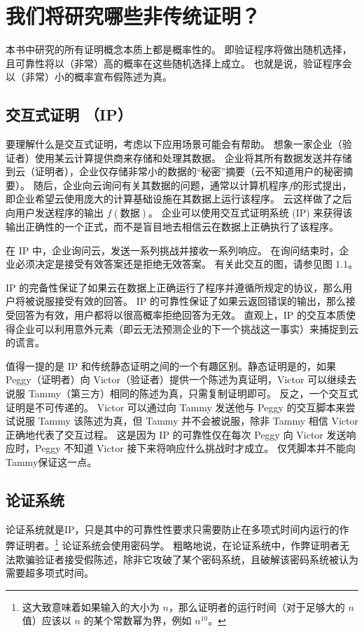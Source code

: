 \section{我们将研究哪些非传统证明？}
本书中研究的所有证明概念本质上都是概率性的。
即验证程序将做出随机选择，且可靠性将以（非常）高的概率在这些随机选择上成立。 
也就是说，验证程序会以（非常）小的概率宣布假陈述为真。

\subsection{交互式证明 （IP）}
要理解什么是交互式证明，考虑以下应用场景可能会有帮助。 想象一家企业（验证者）使用某云计算提供商来存储和处理其数据。 
企业将其所有数据发送并存储到云（证明者），企业仅存储非常小的数据的“秘密”摘要（云不知道用户的秘密摘要）。 
随后，企业向云询问有关其数据的问题，通常以计算机程序$f$的形式提出，即企业希望云使用庞大的计算基础设施在其数据上运行该程序。 
云这样做了之后向用户发送程序的输出 $f(\text{数据})$。 企业可以使用交互式证明系统 (IP) 来获得该输出正确性的一个正式，而不是盲目地去相信云在数据上正确执行了该程序。

在 IP 中，企业询问云，发送一系列挑战并接收一系列响应。 在询问结束时，企业必须决定是接受有效答案还是拒绝无效答案。 有关此交互的图，请参见图 1.1。

IP 的完备性保证了如果云在数据上正确运行了程序并遵循所规定的协议，那么用户将被说服接受有效的回答。 IP 的可靠性保证了如果云返回错误的输出，那么接受回答为有效，用户都将以很高概率拒绝回答为无效。 直观上，IP 的交互本质使得企业可以利用意外元素（即云无法预测企业的下一个挑战这一事实）来捕捉到云的谎言。

值得一提的是 IP 和传统静态证明之间的一个有趣区别。静态证明是的，如果 Peggy（证明者）向 Victor（验证者）提供一个陈述为真证明，Victor 可以继续去说服 Tammy（第三方）相同的陈述为真，只需复制证明即可。 反之，一个交互式证明是不可传递的。 Victor 可以通过向 Tammy 发送他与 Peggy 的交互脚本来尝试说服 Tammy 该陈述为真，但 Tammy 并不会被说服，除非 Tammy 相信 Victor 正确地代表了交互过程。 这是因为 IP 的可靠性仅在每次 Peggy 向 Victor 发送响应时，Peggy 不知道 Victor 接下来将响应什么挑战时才成立。 仅凭脚本并不能向Tammy保证这一点。

\subsection{论证系统}
论证系统就是IP，只是其中的可靠性性要求只需要防止在多项式时间内运行的作弊证明者。\footnote{这大致意味着如果输入的大小为 $n$，那么证明者的运行时间（对于足够大的 $n$ 值）应该以 $n$ 的某个常数幂为界，例如 $n^{10} $。}
论证系统会使用密码学。 
粗略地说，在论证系统中，作弊证明者无法欺骗验证者接受假陈述，除非它攻破了某个密码系统，且破解该密码系统被认为需要超多项式时间。

